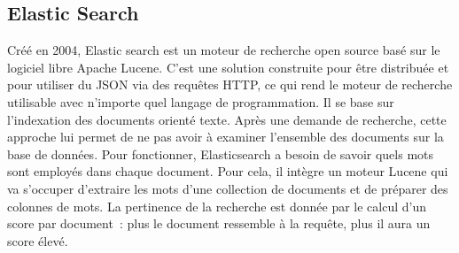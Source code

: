 \subsection{Elastic Search}
Créé en 2004, Elastic search est un moteur de recherche open source basé sur le logiciel libre Apache Lucene. C’est une solution construite pour être distribuée et pour utiliser du JSON via des requêtes HTTP, ce qui rend le moteur de recherche utilisable avec n'importe quel langage de programmation. Il se base sur l’indexation des documents orienté texte. Après une demande de recherche, cette approche lui permet de ne pas avoir à examiner l’ensemble des documents sur la base de données. 
Pour fonctionner, Elasticsearch a besoin de savoir quels mots sont employés dans chaque document. Pour cela, il intègre un moteur Lucene qui va s’occuper d’extraire les mots d’une collection de documents et de préparer des colonnes de mots.
La pertinence de la recherche est donnée par le calcul d’un score par document : plus le document ressemble à la requête, plus il aura un score élevé. 
